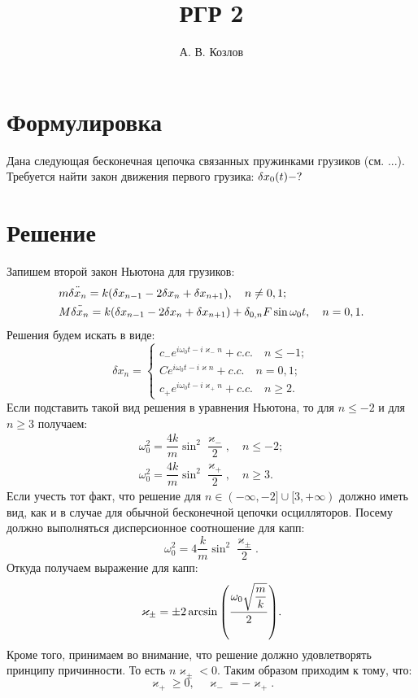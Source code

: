 \documentclass[a4paper,russian]{article}
\title{РГР 2}
\author{А. В. Козлов}
\renewcommand{\kappa}{\varkappa}
\begin{document}
\maketitle
\section{Формулировка}
Дана следующая бесконечная цепочка связанных пружинками 
грузиков (см. ...).
Требуется найти закон движения первого грузика: 
$\delta x_0\qty(t) - ?$ 

\section{Решение}
Запишем второй закон Ньютона для грузиков:
\begin{align}
 & m\ddot{\delta x_n} = k \qty(\delta x_{n-1} - 2\delta x_n +
 \delta x_{n+1}),\quad n\ne 0,1;\\
 & M\ddot{\delta x_n} = k \qty(\delta x_{n-1} - 2\delta x_n +
 \delta x_{n+1}) + \delta_{0,n}F\sin{\omega_0t},\quad n= 0,1.
\end{align}
Решения будем искать в виде:
\[
\delta x_n = 
\begin{cases}
	c_- e^{i\omega_0t-i\kappa_-n}+c.c. \quad n\le -1;\\
	C e^{i\omega_0t-i\kappa n}+c.c. \quad n = 0,1;\\
	c_+ e^{i\omega_0t-i\kappa_+ n}+c.c. \quad n\ge 2.
\end{cases}
\]
Если подставить такой вид решения в уравнения Ньютона, то для
$n\le -2$ и для $n\ge 3$ получаем:
\begin{gather}
	\omega_0^2=\dfrac{4k}{m}\sin^2{\dfrac{\kappa_-}{2}},
	\quad n \le -2;\\
	\omega_0^2=\dfrac{4k}{m}\sin^2{\dfrac{\kappa_+}{2}},
	\quad n\ge 3.
\end{gather}
Если учесть тот факт, что решение для $n \in (-\infty,-2] 
\cup [3,+\infty)$ должно иметь вид, как и в случае для
обычной бесконечной цепочки осцилляторов. Посему должно 
выполняться дисперсионное соотношение для капп:
\[
	\omega_0^2=4
	\dfrac{k}{m}\sin^2{\dfrac{\kappa_{\pm}}{2}}
.\]
Откуда получаем выражение для капп:
\[
	\kappa_\pm = \pm 2 \arcsin\qty(\frac{\omega_0\sqrt{\dfrac{m}{k}}}{2})
.\] 
Кроме того, принимаем во внимание, что решение должно
удовлетворять принципу причинности. То есть $n\kappa_{\pm}<0$.
Таким образом приходим к тому, что:
\begin{equation*}
\kappa_+ \ge 0, \quad \kappa_- = -\kappa_+ .
\end{equation*}
\end{document}
